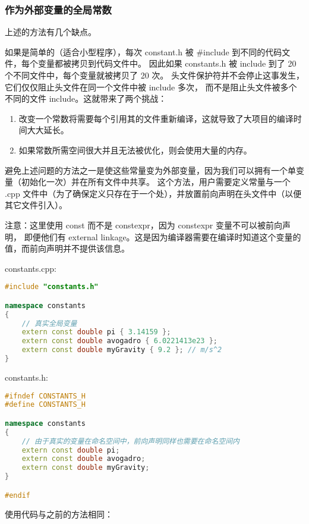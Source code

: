 \documentclass[../../LearnCpp.tex]{subfiles}
\begin{document}
\subsubsection*{作为外部变量的全局常数}

上述的方法有几个缺点。

如果是简单的（适合小型程序），每次 constant.h 被 \#include 到不同的代码文件，每个变量都被拷贝到代码文件中。
因此如果 constants.h 被 include 到了 20 个不同文件中，每个变量就被拷贝了 20 次。
头文件保护符并不会停止这事发生，它们仅仅阻止头文件在同一个文件中被 include 多次，
而不是阻止头文件被多个不同的文件 include。这就带来了两个挑战：

\begin{enumerate}
    \item 改变一个常数将需要每个引用其的文件重新编译，这就导致了大项目的编译时间大大延长。
    \item 如果常数所需空间很大并且无法被优化，则会使用大量的内存。
\end{enumerate}

避免上述问题的方法之一是使这些常量变为外部变量，因为我们可以拥有一个单变量（初始化一次）并在所有文件中共享。
这个方法，用户需要定义常量与一个 .cpp 文件中（为了确保定义只存在于一个处），并放置前向声明在头文件中（以便其它文件引入）。

注意：这里使用 const 而不是 constexpr，因为 constexpr 变量不可以被前向声明，
即便他们有 external linkage。这是因为编译器需要在编译时知道这个变量的值，而前向声明并不提供该信息。

constants.cpp:

\begin{lstlisting}[language=C++]
#include "constants.h"

namespace constants
{
    // 真实全局变量
    extern const double pi { 3.14159 };
    extern const double avogadro { 6.0221413e23 };
    extern const double myGravity { 9.2 }; // m/s^2
}
\end{lstlisting}

constants.h:

\begin{lstlisting}[language=C++]
#ifndef CONSTANTS_H
#define CONSTANTS_H

namespace constants
{
    // 由于真实的变量在命名空间中，前向声明同样也需要在命名空间内
    extern const double pi;
    extern const double avogadro;
    extern const double myGravity;
}

#endif
\end{lstlisting}

使用代码与之前的方法相同：
\end{document}
